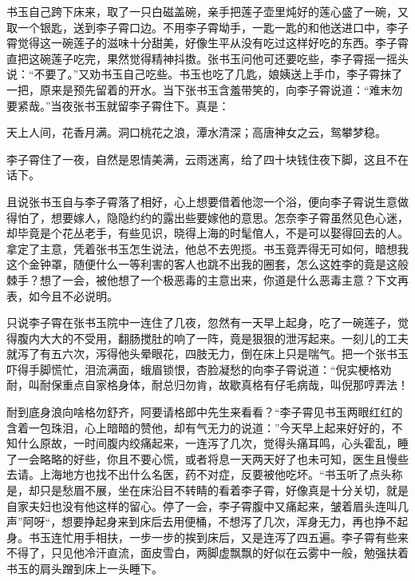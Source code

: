 \documentclass[12pt,UTF8]{ctexbook}
\begin{document}
{{{书玉自己跨下床来，取了一只白磁盖碗，亲手把莲子壶里炖好的莲心盛了一碗，又取一个银匙，送到李子霄口边。不用李子霄坳手，一匙一匙的和他送进口中，李子霄觉得这一碗莲子的滋味十分甜美，好像生平从没有吃过这样好吃的东西。李子霄直把这碗莲子吃完，果然觉得精神抖擞。张书玉问他可还要吃些，李子霄摇一摇头说：“不要了。”又劝书玉自己吃些。书玉也吃了几匙，娘姨送上手巾，李子霄抹了一把，原来是预先留着的开水。当下张书玉含羞带笑的，向李子霄说道：“难末勿要紧哉。”当夜张书玉就留李子霄住下。真是：

天上人间，花香月满。洞口桃花之浪，潭水清深；高唐神女之云，鸳攀梦稳。

李子霄住了一夜，自然是恩情美满，云雨迷离，给了四十块钱住夜下脚，这且不在话下。

且说张书玉自与李子霄落了相好，心上想要借着他淴一个浴，便向李子霄说生意做得怕了，想要嫁人，隐隐约约的露出些要嫁他的意思。怎奈李子霄虽然见色心迷，却毕竟是个花丛老手，有些见识，晓得上海的时髦倌人，不是可以娶得回去的人。拿定了主意，凭着张书玉怎生说法，他总不去兜揽。书玉竟弄得无可如何，暗想我这个金钟罩，随便什么一等利害的客人也跳不出我的圈套，怎么这姓李的竟是这般棘手？想了一会，被他想了一个极恶毒的主意出来，你道是什么恶毒主意？下文再表，如今且不必说明。

只说李子霄在张书玉院中一连住了几夜，忽然有一天早上起身，吃了一碗莲子，觉得腹内大大的不受用，翻肠搅肚的响了一阵，竟是狠狠的泄泻起来。一刻儿的工夫就泻了有五六次，泻得他头晕眼花，四肢无力，倒在床上只是喘气。把一个张书玉吓得手脚慌忙，泪流满面，蛾眉锁恨，杏脸凝愁的向李子霄说道：“倪实梗格劝耐，叫耐保重点自家格身体，耐总归勿肯，故歇真格有仔毛病哉，叫倪那哼弄法！

耐到底身浪向啥格勿舒齐，阿要请格郎中先生来看看？“李子霄见书玉两眼红红的含着一包珠泪，心上暗暗的赞他，却有气无力的说道：”今天早上起来好好的，不知什么原故，一时间腹内绞痛起来，一连泻了几次，觉得头痛耳鸣，心头霍乱，睡了一会略略的好些，你且不要心慌，或者将息一天两天好了也未可知，医生且慢些去请。上海地方也找不出什么名医，药不对症，反要被他吃坏。“书玉听了点头称是，却只是愁眉不展，坐在床沿目不转睛的看着李子霄，好像真是十分关切，就是自家夫妇也没有他这样的留心。停了一会，李子霄腹中又痛起来，皱着眉头连叫几声”阿呀“，想要挣起身来到床后去用便桶，不想泻了几次，浑身无力，再也挣不起身。书玉连忙用手相扶，一步一步的挨到床后，又是连泻了四五遍。李子霄有些来不得了，只见他冷汗直流，面皮雪白，两脚虚飘飘的好似在云雾中一般，勉强扶着书玉的肩头蹭到床上一头睡下。

}}}
\end{document}
